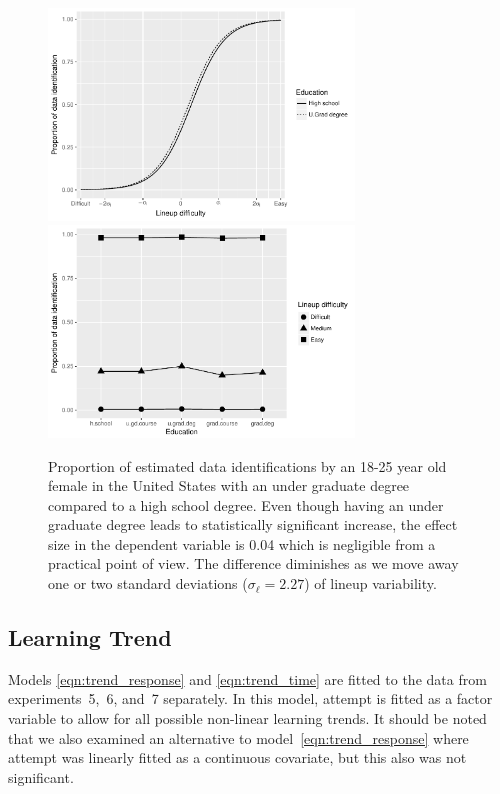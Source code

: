 \documentclass[10pt]{article}\usepackage[]{graphicx}\usepackage[]{xcolor}
\begin{document}
\begin{figure}[htbp] 
   \centering
    \includegraphics[width=3.2in]{practical_impact_und_graduate.pdf} 
    \includegraphics[width=3.2in]{practical_impact_degree.pdf} 
   \caption{Proportion of estimated data identifications by an 18-25 year old female in the United States with an under graduate degree compared to a high school degree. Even though having an under graduate degree leads to  statistically significant increase, the effect size in the dependent variable is  0.04 which is  negligible from a practical point of view. The difference diminishes as we move away one or two standard deviations ($\sigma_{\ell} = 2.27$) 
   of lineup variability.}
   \label{practical_impact_und_und_graduate.pdf}
\end{figure}




\subsection{Learning Trend} Models \eqref{eqn:trend_response} and \eqref{eqn:trend_time} are fitted to the data from experiments~5,~6, and~7 separately. In this model, attempt is fitted as a factor variable to allow for all possible non-linear learning trends.  It should be noted that we also examined an alternative to model~\eqref{eqn:trend_response} where attempt was linearly fitted as a continuous covariate, but this also was not significant.
\end{document}
